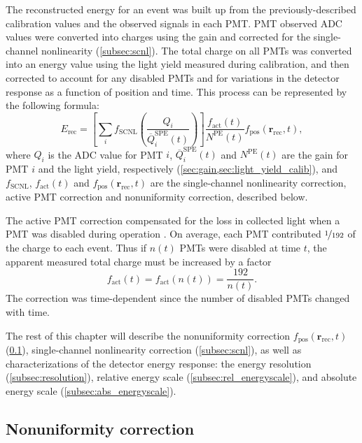 The reconstructed energy for an event was built up from the previously-described
calibration values and the observed signals in each PMT.
PMT observed ADC values were converted into charges using the gain
and corrected for the single-channel nonlinearity (\cref{subsec:scnl}).
The total charge on all PMTs was converted into an energy value
using the light yield measured during calibration,
and then corrected to account for any disabled PMTs
and for variations in the detector response as a function of position and time.
This process can be represented by the following formula:
\begin{equation}
    E_{\text{rec}} = \left[
        \sum_i f_{\text{SCNL}}\left(\frac{Q_i}{\overline{Q}_i^{\text{SPE}}(t)}\right)
    \right]
    \frac{f_{\text{act}}(t)}{N^{\text{PE}}(t)}
    f_{\text{pos}}(\textbf{r}_{\text{rec}},t),
\end{equation}
where $Q_i$ is the ADC value for PMT $i$,
$\overline{Q}_i^{\text{SPE}}(t)$ and $N^{\text{PE}}(t)$
are the gain for PMT $i$ and the light yield, respectively
(\cref{sec:gain,sec:light_yield_calib}), and
$f_{\text{SCNL}}$, $f_{\text{act}}(t)$ and $f_{\text{pos}}(\textbf{r}_{\text{rec}},t)$
are the single-channel nonlinearity correction,
active PMT correction and nonuniformity correction,
described below.

The active PMT correction compensated for the loss in collected light
when a PMT was disabled during operation \cite{ngd2016}.
On average, each PMT contributed $\nicefrac{1}{192}$ of the charge to each event.
Thus if $n(t)$ PMTs were disabled at time $t$, the apparent measured total charge must be increased by a factor
\begin{equation}
    f_{\text{act}}(t) = f_{\text{act}}(n(t)) = \frac{192}{n(t)}.
\end{equation}
The correction was time-dependent since the number of disabled PMTs changed with time.

The rest of this chapter will describe the
nonuniformity correction $f_{\text{pos}}(\textbf{r}_{\text{rec}},t)$
(\cref{subsec:nonuniformity}),
single-channel nonlinearity correction (\cref{subsec:scnl}),
as well as characterizations of the detector energy response:
the energy resolution (\cref{subsec:resolution}),
relative energy scale (\cref{subsec:rel_energyscale}),
and absolute energy scale (\cref{subsec:abs_energyscale}).

\subsection{Nonuniformity correction}
\label{subsec:nonuniformity}

